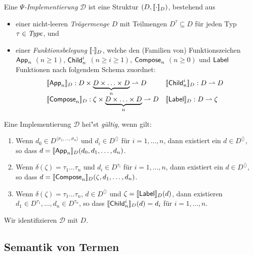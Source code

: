 \documentclass[%
  12pt,%
  a4paper,%
]{article}
\begin{document}
Eine \emph{$\Psi$-Implementierung} $\mathcal{D}$ ist eine Struktur $(D,[\![\cdot]\!]_D)$, bestehend aus
\begin{itemize}
\item einer nicht-leeren \emph{Tr\"agermenge $D$} mit Teilmengen $D^\tau \subseteq D$ f\"ur jeden Typ
  $\tau \in \mathit{Type}$, und
\item einer \emph{Funktionsbelegung $[\![\cdot]\!]_D$}, welche den (Familien von) Funktionszeichen
  $\mathsf{App}_n$ $(n \ge 1)$, $\mathsf{Child}_n^i$ $(n \ge i \ge 1)$, $\mathsf{Compose}_n$ $(n \ge 0)$ und $\mathsf{Label}$ Funktionen
  nach folgendem Schema zuordnet:
  \[\begin{array}{ll}
    \sem{\App_n}_D: D \times \underbrace{D \times \ldots \times D}_n \pto D &
    \sem{\Child_n^i}_D: D \pto D \\
    \sem{\Compose_n}_D: \zeta \times \underbrace{D \times \ldots \times D}_n \pto D &
    \sem{\Label}_D: D \pto \zeta \\
  \end{array}\]
\end{itemize}
Eine Implementierung $\mathcal{D}$ hei"st \emph{g\"ultig}, wenn gilt:
\begin{enumerate}
\item Wenn $d_0 \in D^{\langle \sigma_1,\ldots,\sigma_n \rangle}$ und $d_i \in D^{\langle \rangle}$ f\"ur $i=1,\ldots,n$,
  dann existiert ein $d \in D^{\langle \rangle}$, so dass $d = [\![\mathsf{App}_n]\!]_D(d_0,d_1,\ldots,d_n)$.
\item Wenn $\delta(\zeta) = \tau_1\ldots\tau_n$ und $d_i \in D^{\tau_i}$ f\"ur $i=1,\ldots,n$,
  dann existiert ein $d \in D^{\langle \rangle}$, so dass $d = [\![\mathsf{Compose}_n]\!]_D(\zeta,d_1,\ldots,d_n)$.
\item Wenn $\delta(\zeta) = \tau_1\ldots\tau_n$, $d \in D^{\langle \rangle}$ und $\zeta = [\![\mathsf{Label}]\!]_D(d)$, dann
  existieren $d_1 \in D^{\tau_1},\ldots,d_n \in D^{\tau_n}$, so dass $[\![\mathsf{Child}_n^i]\!]_D(d) = d_i$ f\"ur $i=1,\ldots,n$.
\end{enumerate}
Wir identifizieren $\mathcal{D}$ mit $D$.

\subsection*{Semantik von Termen}
\end{document}
